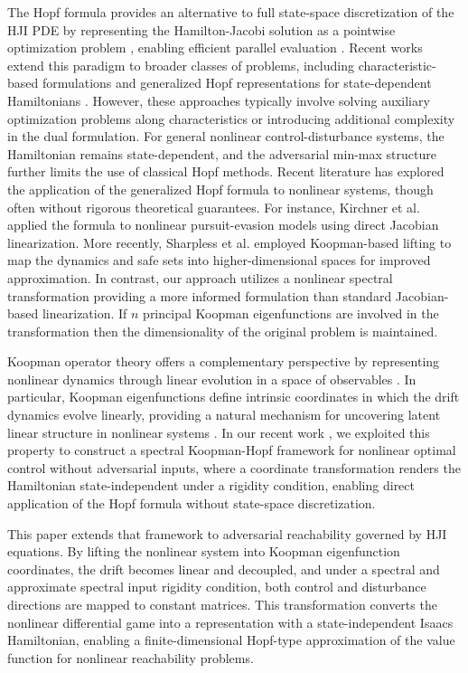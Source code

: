 \documentclass[letterpaper, 10 pt, conference]{ieeeconf}
\theoremstyle{plain}
\theoremstyle{definition}
\begin{document}
{\color{black}
The Hopf formula provides an alternative to full state-space discretization of the HJI PDE by representing the Hamilton-Jacobi solution as a pointwise optimization problem \cite{hopf1965generalized, bardi1984hopf}, enabling efficient parallel evaluation \cite{darbon2016algorithms, chow2019algorithm}.}
Recent works extend this paradigm to broader classes of problems, including characteristic-based formulations and generalized Hopf representations for state-dependent Hamiltonians \cite{yegorov2021perspectives, lee2020hopf, chen2024hopf}. However, these approaches typically involve solving auxiliary optimization problems along characteristics or introducing additional complexity in the dual formulation. For general nonlinear control-disturbance systems, the Hamiltonian remains state-dependent, and the adversarial min-max structure further limits the use of classical Hopf methods. 
Recent literature has explored the application of the generalized Hopf formula to nonlinear systems, though often without rigorous theoretical guarantees. For instance, Kirchner et al. \cite{kirchner2017time} applied the formula to nonlinear pursuit-evasion models using direct Jacobian linearization. More recently, Sharpless et al. \cite{sharpless2023koopman} employed Koopman-based lifting to map the dynamics and safe sets into higher-dimensional spaces for improved approximation. 
{\color{black}In contrast, our approach utilizes a nonlinear spectral transformation providing a more informed formulation than standard Jacobian-based linearization. If $n$ principal Koopman eigenfunctions are involved in the transformation then the dimensionality of the original problem is maintained.}

Koopman operator theory offers a complementary perspective by representing nonlinear dynamics through linear evolution in a space of observables \cite{mezic2020spectrum}. In particular, Koopman eigenfunctions define intrinsic coordinates in which the drift dynamics evolve linearly, providing a natural mechanism for uncovering latent linear structure in nonlinear systems \cite{korda2018linear, korda2020optimal, vaidya2025koopman}. In our recent work \cite{sutavani2025spectral}, we exploited this property to construct a spectral Koopman-Hopf framework for nonlinear optimal control without adversarial inputs, where a coordinate transformation renders the Hamiltonian state-independent under a rigidity condition, enabling direct application of the Hopf formula without state-space discretization.

This paper extends that framework to adversarial reachability governed by HJI equations. By lifting the nonlinear system into Koopman eigenfunction coordinates, the drift becomes linear and decoupled, and under a spectral and approximate spectral input rigidity condition, both control and disturbance directions are mapped to constant matrices. This transformation converts the nonlinear differential game into a representation with a state-independent Isaacs Hamiltonian, enabling a finite-dimensional Hopf-type approximation of the value function for nonlinear reachability problems.
\end{document}
